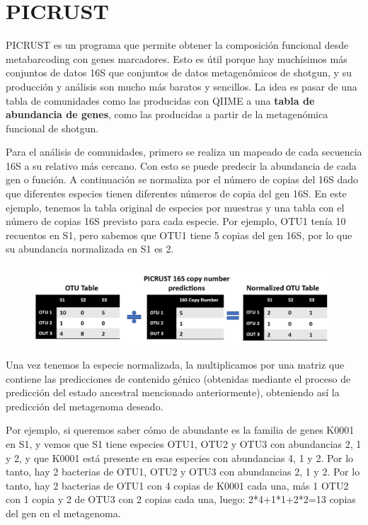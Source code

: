 \section{PICRUST}
PICRUST es un programa que permite obtener la composición funcional desde metabarcoding con genes marcadores. Esto es útil porque hay muchísimos más conjuntos de datos 16S que conjuntos de datos metagenómicos de shotgun, y su producción y análisis son mucho más baratos y sencillos. La idea es pasar de una tabla de comunidades como las producidas con QIIME a una \textbf{tabla de abundancia de genes}, como las producidas a partir de la metagenómica funcional de shotgun.

Para el análisis de comunidades, primero se realiza un mapeado de cada secuencia 16S a su relativo más cercano. Con esto se puede predecir la abundancia de cada gen o función. A continuación se normaliza por el número de copias del 16S dado que diferentes especies tienen diferentes números de copia del gen 16S. En este ejemplo, tenemos la tabla original de especies por muestras y una tabla con el número de copias 16S previsto para cada especie. Por ejemplo, OTU1 tenía 10 recuentos en S1, pero sabemos que OTU1 tiene 5 copias del gen 16S, por lo que su abundancia normalizada en S1 es 2.

\begin{figure}[h]
\centering
\includegraphics[width = \textwidth]{figs/picrust-normalizacion.png}
\end{figure}

Una vez tenemos la especie normalizada, la multiplicamos por una matriz que contiene las predicciones de contenido génico (obtenidas mediante el proceso de predicción del estado ancestral mencionado anteriormente), obteniendo así la predicción del metagenoma deseado. 

Por ejemplo, si queremos saber cómo de abundante es la familia de genes K0001 en S1, y vemos que S1 tiene especies OTU1, OTU2 y OTU3 con abundancias 2, 1 y 2, y que K0001 está presente en esas especies con abundancias 4, 1 y 2. Por lo tanto, hay 2 bacterias de OTU1, OTU2 y OTU3 con abundancias 2, 1 y 2. Por lo tanto, hay 2 bacterias de OTU1 con 4 copias de K0001 cada una, más 1 OTU2 con 1 copia y 2 de OTU3 con 2 copias cada una, luego: 2*4+1*1+2*2=13 copias del gen en el metagenoma.

